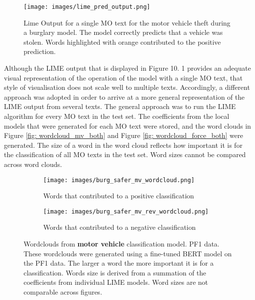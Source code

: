 \begin{figure}[!tbp]
  \centering
    \texttt{[image: images/lime\_pred\_output.png]}
    \caption[Lime Output for a single MO text for the motor vehicle theft during a burglary model.]{ Lime Output for a single MO text for the motor vehicle theft during a burglary model. The model correctly predicts that a vehicle was stolen. Words highlighted with orange contributed to the positive prediction.}
    \label{fig:lime_out1}
\end{figure}



Although the LIME output that is displayed in Figure 10. 1 provides an adequate visual representation of the operation of the model with a single MO text, that style of visualisation does not scale well to multiple texts. Accordingly, a different approach was adopted in order to arrive at a more general representation of the LIME output from several texts. The general approach was to run the LIME algorithm for every MO text in the test set. The coefficients from the local models that were generated for each MO text were stored, and the word clouds in Figure \ref{fig: wordcloud_mv_both}  and Figure \ref{fig: wordcloud_force_both} were generated. The size of a word in the word cloud reflects how important it is for the classification of all MO texts in the test set. Word sizes cannot be compared across word clouds.  



\begin{figure}
     \centering
     \begin{subfigure}[b]{0.9\textwidth}
         \centering
         \texttt{[image: images/burg\_safer\_mv\_wordcloud.png]}
         \caption{Words that contributed to a positive classification}
         \label{fig: wordcloud_mv}
     \end{subfigure}
     \vfill
     \begin{subfigure}[b]{0.9\textwidth}
         \centering
         \texttt{[image: images/burg\_safer\_mv\_rev\_wordcloud.png]}
         \caption{Words that contributed to a negative classification}
         \label{fig: wordcloud_mv_rev}
     \end{subfigure}
        \caption[Wordclouds from  \textbf{motor vehicle} classification model. PF1 data.]{Wordclouds from  \textbf{motor vehicle} classification model. PF1 data. These wordclouds were generated using a fine-tuned BERT model on the PF1 data. The larger a word the more important it is for a classification. Words size is derived from a summation of the coefficients from individual LIME models. Word sizes are not comparable across figures.}
        \label{fig:wordcloud_mv_both}
        
\end{figure}


